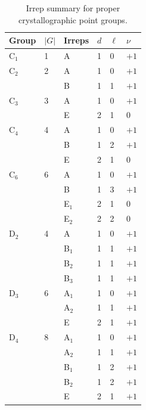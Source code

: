 \documentclass[aps,prb,onecolumn]{revtex4-2}
\begin{document}
\begin{table}[h]
\caption{Irrep summary for proper crystallographic point groups.}
\begin{ruledtabular}
\begin{tabular}{llllll}
Group & $|G|$ & Irreps & $d$ & $\ell$ & $\nu$ \\
\midrule
C$_1$ & 1  & A       & 1       & 0       & $+1$ \\
\midrule
C$_2$ & 2  & A       & 1       & 0       & $+1$ \\
      &    & B       & 1       & 1       & $+1$ \\
\midrule
C$_3$ & 3  & A       & 1       & 0       & $+1$ \\
      &    & E       & 2       & 1       & $0$  \\
\midrule
C$_4$ & 4  & A       & 1       & 0       & $+1$ \\
      &    & B       & 1       & 2       & $+1$ \\
      &    & E       & 2       & 1       & $0$  \\
\midrule
C$_6$ & 6  & A       & 1       & 0       & $+1$ \\
      &    & B       & 1       & 3       & $+1$ \\
      &    & E$_1$   & 2       & 1       & $0$  \\
      &    & E$_2$   & 2       & 2       & $0$  \\
\midrule
D$_2$ & 4  & A       & 1       & 0       & $+1$ \\
      &    & B$_1$   & 1       & 1       & $+1$ \\
      &    & B$_2$   & 1       & 1       & $+1$ \\
      &    & B$_3$   & 1       & 1       & $+1$ \\
\midrule
D$_3$ & 6  & A$_1$   & 1       & 0       & $+1$ \\
      &    & A$_2$   & 1       & 1       & $+1$ \\
      &    & E       & 2       & 1       & $+1$ \\
\midrule
D$_4$ & 8  & A$_1$   & 1       & 0       & $+1$ \\
      &    & A$_2$   & 1       & 1       & $+1$ \\
      &    & B$_1$   & 1       & 2       & $+1$ \\
      &    & B$_2$   & 1       & 2       & $+1$ \\
      &    & E       & 2       & 1       & $+1$ \\
\midrule

\end{tabular}
\end{ruledtabular}
\end{table}
\end{document}
